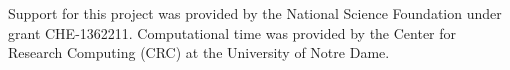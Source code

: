 \documentclass[aps,jcp,preprint,showpacs,superscriptaddress,groupedaddress]{revtex4-1}  %
\begin{document}
\begin{acknowledgments}
  Support for this project was provided by the National Science Foundation
  under grant CHE-1362211. Computational time was provided by the
  Center for Research Computing (CRC) at the University of Notre Dame.
\end{acknowledgments}

\newpage


\end{document}
